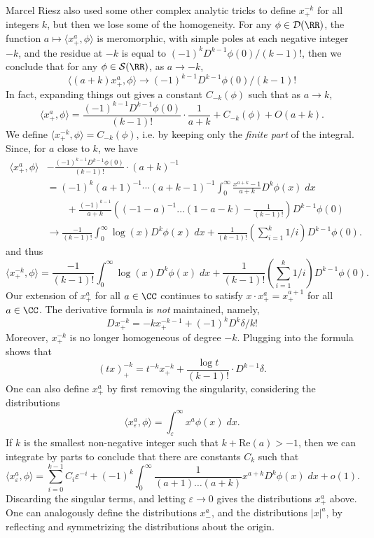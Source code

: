 \begin{example}
  Marcel Riesz also used some other complex analytic tricks to define $x^{-k}_+$ for all integers $k$, but then we lose some of the homogeneity. For any $\phi \in \mathcal{D}(\RR)$, the function $a \mapsto \langle x^a_+, \phi \rangle$ is meromorphic, with simple poles at each negative integer $-k$, and the residue at $-k$ is equal to $(-1)^k D^{k-1} \phi(0) / (k-1)!$, then we conclude that for any $\phi \in \mathcal{S}(\RR)$, as $a \to -k$,
  \[ \langle (a + k) x^a_+, \phi \rangle \to (-1)^{k-1} D^{k-1} \phi(0) / (k-1)! \]
  In fact, expanding things out gives a constant $C_{-k}(\phi)$ such that as $a \to k$,
  \[ \langle x^a_+, \phi \rangle = \frac{(-1)^{k-1} D^{k-1} \phi(0)}{(k-1)!} \cdot \frac{1}{a + k} + C_{-k}(\phi) + O(a+k). \]
  We define $\langle x^{-k}_+, \phi \rangle = C_{-k}(\phi)$, i.e. by keeping only the \emph{finite part} of the integral. Since, for $a$ close to $k$, we have
  \begin{align*} \langle x^a_+, \phi \rangle &- \frac{(-1)^{k-1} D^{k-1} \phi(0)}{(k-1)!} \cdot (a+k)^{-1}\\
  &= (-1)^k (a+1)^{-1} \cdots (a+k-1)^{-1} \int_0^\infty \frac{x^{a + k} - 1}{a+k} D^k \phi(x)\; dx\\
  &\quad\quad + \frac{(-1)^{k-1}}{a+k} \left( (-1-a)^{-1} \dots (1-a-k) - \frac{1}{(k-1)!} \right) D^{k-1} \phi(0)\\
  &\to \frac{-1}{(k-1)!} \int_0^\infty \log(x) D^k \phi(x)\; dx + \frac{1}{(k-1)!} \left(\sum_{i = 1}^k 1/i \right) D^{k-1} \phi(0).
  \end{align*}
  and thus
  \[ \langle x^{-k}_+, \phi \rangle = \frac{-1}{(k-1)!} \int_0^\infty \log(x) D^k \phi(x)\; dx + \frac{1}{(k-1)!} \left(\sum_{i = 1}^k 1/i \right) D^{k-1} \phi(0). \]
  Our extension of $x^a_+$ for all $a \in \CC$ continues to satisfy $x \cdot x^a_+ = x^{a+1}_+$ for all $a \in \CC$. The derivative formula is \emph{not} maintained, namely,
  \[ D x^{-k}_+ = -k x^{-k-1}_+ + (-1)^k D^k \delta / k! \]
  Moreover, $x^{-k}_+$ is no longer homogeneous of degree $-k$. Plugging into the formula shows that
  \[ (tx)^{-k}_+ = t^{-k} x^{-k}_+ + \frac{\log t}{(k-1)!} \cdot D^{k-1} \delta. \]
  One can also define $x^a_+$ by first removing the singularity, considering the distributions
  \[ \langle x^a_\varepsilon, \phi \rangle = \int_\varepsilon^\infty x^a \phi(x)\; dx. \]
  If $k$ is the smallest non-negative integer such that $k + \text{Re}(a) > -1$, then we can integrate by parts to conclude that there are constants $C_k$ such that
  \[ \langle x^a_\varepsilon, \phi \rangle = \sum_{i = 0}^{k-1} C_i \varepsilon^{-i} + (-1)^k \int_0^\infty \frac{1}{(a+1) \dots (a+k)} x^{a + k} D^k \phi(x)\; dx + o(1). \]
  Discarding the singular terms, and letting $\varepsilon \to 0$ gives the distributions $x^a_+$ above. One can analogously define the distributions $x^a_-$, and the distributions $|x|^a$, by reflecting and symmetrizing the distributions about the origin.
\end{example}


